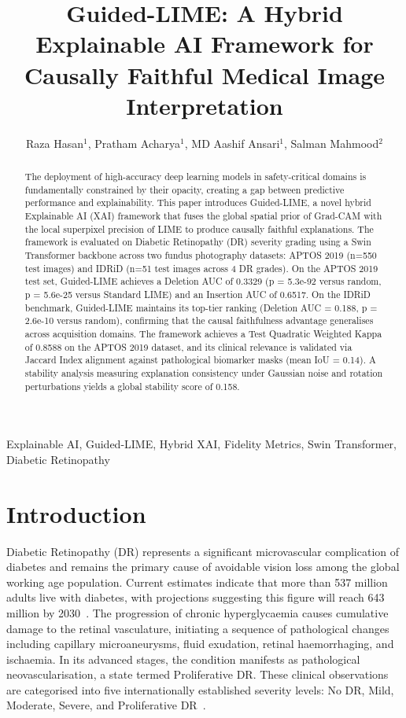 \documentclass[10pt,twoside]{article}
\title{Guided-LIME: A Hybrid Explainable AI Framework for\\Causally Faithful Medical Image Interpretation}
\author{Raza Hasan$^{1}$, Pratham Acharya$^{1}$, MD Aashif Ansari$^{1}$, Salman Mahmood$^{2}$}
\date{}
\begin{document}
\maketitle

\begin{abstract}
The deployment of high-accuracy deep learning models in safety-critical domains is fundamentally constrained by their opacity, creating a gap between predictive performance and explainability. This paper introduces Guided-LIME, a novel hybrid Explainable AI (XAI) framework that fuses the global spatial prior of Grad-CAM with the local superpixel precision of LIME to produce causally faithful explanations. The framework is evaluated on Diabetic Retinopathy (DR) severity grading using a Swin Transformer backbone across two fundus photography datasets: APTOS 2019 (n=550 test images) and IDRiD (n=51 test images across 4 DR grades). On the APTOS 2019 test set, Guided-LIME achieves a Deletion AUC of 0.3329 (p = 5.3e-92 versus random, p = 5.6e-25 versus Standard LIME) and an Insertion AUC of 0.6517. On the IDRiD benchmark, Guided-LIME maintains its top-tier ranking (Deletion AUC = 0.188, p = 2.6e-10 versus random), confirming that the causal faithfulness advantage generalises across acquisition domains. The framework achieves a Test Quadratic Weighted Kappa of 0.8588 on the APTOS 2019 dataset, and its clinical relevance is validated via Jaccard Index alignment against pathological biomarker masks (mean IoU = 0.14). A stability analysis measuring explanation consistency under Gaussian noise and rotation perturbations yields a global stability score of 0.158.
\end{abstract}

\vspace{0.5em}
 Explainable AI, Guided-LIME, Hybrid XAI, Fidelity Metrics, Swin Transformer, Diabetic Retinopathy

\section{Introduction}
\label{sec:introduction}

Diabetic Retinopathy (DR) represents a significant microvascular complication of diabetes and remains the primary cause of avoidable vision loss among the global working age population. Current estimates indicate that more than 537 million adults live with diabetes, with projections suggesting this figure will reach 643 million by 2030~\cite{teo2021global}. The progression of chronic hyperglycaemia causes cumulative damage to the retinal vasculature, initiating a sequence of pathological changes including capillary microaneurysms, fluid exudation, retinal haemorrhaging, and ischaemia. In its advanced stages, the condition manifests as pathological neovascularisation, a state termed Proliferative DR. These clinical observations are categorised into five internationally established severity levels: No DR, Mild, Moderate, Severe, and Proliferative DR~\cite{wong2016diabetic}.
\end{document}
